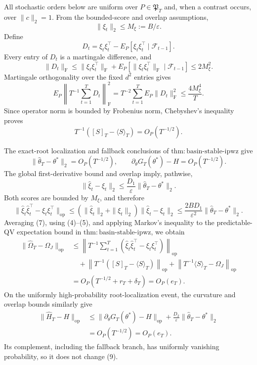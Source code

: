 All stochastic orders below are uniform over \(P\in\mathfrak P_T\) and, when a contrast occurs, over \(\|c\|_2=1\). From the bounded-score and overlap assumptions,
\[
 \|\xi_t\|_2\le M_\xi:=B/\varepsilon. \tag{1}
\]
Define
\[
 D_t=\xi_t\xi_t^\top-E_P[\xi_t\xi_t^\top\mid\mathcal F_{t-1}].
\]
Every entry of \(D_t\) is a martingale difference, and
\[
 \|D_t\|_{\mathrm F}
 \le \|\xi_t\xi_t^\top\|_{\mathrm F}
 +E_P[\|\xi_t\xi_t^\top\|_{\mathrm F}\mid\mathcal F_{t-1}]
 \le2M_\xi^2. \tag{2}
\]
Martingale orthogonality over the fixed \(d^2\) entries gives
\[
 E_P\left\|T^{-1}\sum_{t=1}^TD_t\right\|_{\mathrm F}^2
 =T^{-2}\sum_{t=1}^TE_P\|D_t\|_{\mathrm F}^2
 \le\frac{4M_\xi^4}{T}. \tag{3}
\]
Since operator norm is bounded by Frobenius norm, Chebyshev's inequality proves
\[
 T^{-1}([S]_T-\langle S\rangle_T)=O_P(T^{-1/2}). \tag{4}
\]

The exact-root localization and fallback conclusions of \(\mathrm{thm:basin\text{-}stable\text{-}ipwz}\) give
\[
 \|\widehat\theta_T-\theta^*\|_2=O_P(T^{-1/2}),
 \qquad
 \partial_\theta G_T(\theta^*)-H=O_P(T^{-1/2}). \tag{5}
\]
The global first-derivative bound and overlap imply, pathwise,
\[
 \|\widehat\xi_t-\xi_t\|_2
 \le\frac{D_1}{\varepsilon}\|\widehat\theta_T-\theta^*\|_2. \tag{6}
\]
Both scores are bounded by \(M_\xi\), and therefore
\[
 \|\widehat\xi_t\widehat\xi_t^\top-\xi_t\xi_t^\top\|_{\mathrm{op}}
 \le(\|\widehat\xi_t\|_2+\|\xi_t\|_2)\|\widehat\xi_t-\xi_t\|_2
 \le\frac{2BD_1}{\varepsilon^2}\|\widehat\theta_T-\theta^*\|_2. \tag{7}
\]
Averaging (7), using (4)--(5), and applying Markov's inequality to the predictable-QV expectation bound in \(\mathrm{thm:basin\text{-}stable\text{-}ipwz}\), we obtain
\[
\begin{aligned}
 \|\widehat\Omega_T-\Omega_J\|_{\mathrm{op}}
 &\le\left\|T^{-1}\sum_{t=1}^T
 (\widehat\xi_t\widehat\xi_t^\top-\xi_t\xi_t^\top)\right\|_{\mathrm{op}}\\
 &\quad+\left\|T^{-1}([S]_T-\langle S\rangle_T)\right\|_{\mathrm{op}}
 +\left\|T^{-1}\langle S\rangle_T-\Omega_J\right\|_{\mathrm{op}}\\
 &=O_P(T^{-1/2}+r_T+\delta_T)=O_P(e_T). 
\end{aligned} \tag{8}
\]
On the uniformly high-probability root-localization event, the curvature and overlap bounds similarly give
\[
\begin{aligned}
 \|\widehat H_T-H\|_{\mathrm{op}}
 &\le\|\partial_\theta G_T(\theta^*)-H\|_{\mathrm{op}}
 +\frac{D_2}{\varepsilon}\|\widehat\theta_T-\theta^*\|_2\\
 &=O_P(T^{-1/2})=O_P(e_T).
\end{aligned} \tag{9}
\]
Its complement, including the fallback branch, has uniformly vanishing probability, so it does not change (9).

